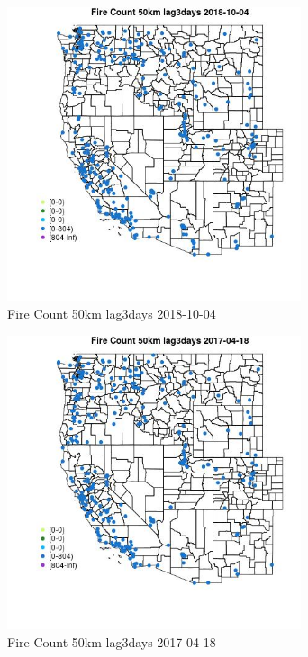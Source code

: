 \begin{figure} 
\centering  
\includegraphics[width=0.77\textwidth]{Code_Outputs/Report_ML_input_PM25_Step4_part_f_de_duplicated_aves_prioritize_24hr_obswNAs_MapObsFire_Count_50km_lag3days2018-10-04.jpg} 
\caption{\label{fig:Report_ML_input_PM25_Step4_part_f_de_duplicated_aves_prioritize_24hr_obswNAsMapObsFire_Count_50km_lag3days2018-10-04}Fire Count 50km lag3days 2018-10-04} 
\end{figure} 
 

\clearpage 

\begin{figure} 
\centering  
\includegraphics[width=0.77\textwidth]{Code_Outputs/Report_ML_input_PM25_Step4_part_f_de_duplicated_aves_prioritize_24hr_obswNAs_MapObsFire_Count_50km_lag3days2017-04-18.jpg} 
\caption{\label{fig:Report_ML_input_PM25_Step4_part_f_de_duplicated_aves_prioritize_24hr_obswNAsMapObsFire_Count_50km_lag3days2017-04-18}Fire Count 50km lag3days 2017-04-18} 
\end{figure} 
 

